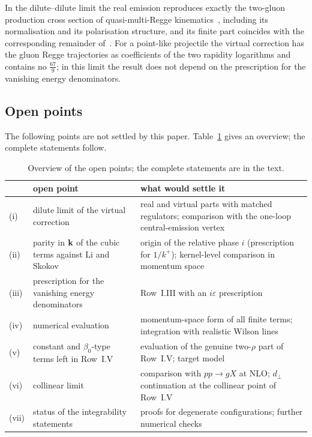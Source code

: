 In the dilute--dilute limit the real emission reproduces exactly the two-gluon production cross section of quasi-multi-Regge kinematics~\cite{Fadin:1998py,Bartels:2006hg}, including its normalisation and its polarisation structure, and its finite part coincides with the corresponding remainder of~\cite{Bartels:2006hg}. For a point-like projectile the virtual correction has the gluon Regge trajectories as coefficients of the two rapidity logarithms and contains no $\frac{67}{9}$; in this limit the result does not depend on the prescription for the vanishing energy denominators.

\subsection{Open points}\label{sec:openpoints}

The following points are not settled by this paper. Table~\ref{tab:open} gives an overview; the complete statements follow.
\begin{table}[t]
\centering
\renewcommand{\arraystretch}{1.25}
\footnotesize
\begin{tabular}{@{}l>{\raggedright\arraybackslash}p{}>{\raggedright\arraybackslash}p{}@{}}
\toprule
 & open point & what would settle it\\
\midrule
(i) & dilute limit of the virtual correction & real and virtual parts with matched regulators; comparison with the one-loop central-emission vertex\\
(ii) & parity in $\mathbf{k}$ of the cubic terms against Li and Skokov & origin of the relative phase $i$ (prescription for $1/k^+$); kernel-level comparison in momentum space\\
(iii) & prescription for the vanishing energy denominators & Row~I.III with an $i\varepsilon$ prescription\\
(iv) & numerical evaluation & momentum-space form of all finite terms; integration with realistic Wilson lines\\
(v) & constant and $\beta_0$-type terms left in Row~I.V & evaluation of the genuine two-$\rho$ part of Row~I.V; target model\\
(vi) & collinear limit & comparison with $pp\to gX$ at NLO; $d_\perp$ continuation at the collinear point of Row~I.V\\
(vii) & status of the integrability statements & proofs for degenerate configurations; further numerical checks\\
\bottomrule
\end{tabular}
\caption{Overview of the open points; the complete statements are in the text.}
\label{tab:open}
\end{table}

